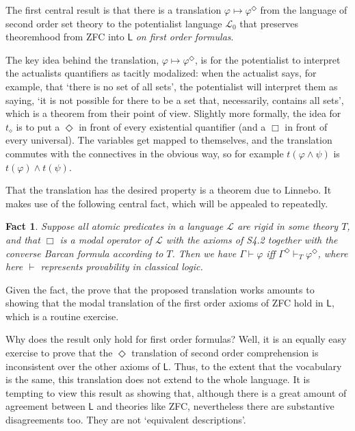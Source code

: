 \documentclass{article}
\newtheorem{fact}{Fact}
\begin{document}
The first central result is that there is a translation $\varphi \mapsto \varphi^\Diamond$ 
from the language of second order set theory 
to the potentialist language $\mathcal{L}_0$ that preserves theoremhood 
from ZFC into $\mathsf{L}$ \emph{on first order formulas}. 

The key idea behind the translation, $\varphi \mapsto \varphi^\Diamond$,  
is for the potentialist to interpret the actualists quantifiers as tacitly modalized:
when the actualist says, for example, that `there is no set of all sets', the potentialist 
will interpret them as saying, `it is not possible for there to be a set that, necessarily, contains all sets',
which is a theorem from their point of view. Slightly more formally, 
the idea for $t_\diamond$ is to put a $\Diamond$ in front of every existential quantifier 
(and a $\Box$ in front of 
every universal). The variables get mapped to themselves, and the translation 
commutes with the connectives in the obvious way, so for example $t(\varphi \wedge \psi)$
is $t(\varphi) \wedge t(\psi)$. 

That the translation has the desired property is a theorem due to Linnebo. It makes 
use of the following central fact, which will be appealed to repeatedly. 

\begin{fact}
    Suppose all atomic predicates in a language $\mathcal{L}$ are rigid in some theory $T$,
    and that $\Box$ 
    is a modal operator of $\mathcal{L}$ with the axioms of S4.2 together with the 
    converse Barcan formula according to $T$. Then we have 
    $\Gamma \vdash \varphi$ iff $\Gamma^\Diamond \vdash_T \varphi^\Diamond$, where here 
    $\vdash$ represents provability in classical logic. 
\end{fact}
Given the fact, the prove that the proposed translation works amounts to showing that 
the modal translation of the first order axioms of ZFC hold in $\mathsf{L}$, which is a 
routine exercise. 

Why does the result only hold for first order formulas? Well, it is an equally easy 
exercise to prove that the $\Diamond$ translation of second order comprehension 
is inconsistent over the other axioms of $\mathsf{L}$. Thus, to the extent that 
the vocabulary is the same, this translation does not extend to the whole language. 
It is tempting to view this result as showing that, although there is a great amount 
of agreement between $\mathsf{L}$ and theories like ZFC, nevertheless there are substantive 
disagreements too. They are not `equivalent descriptions'.
\end{document}
